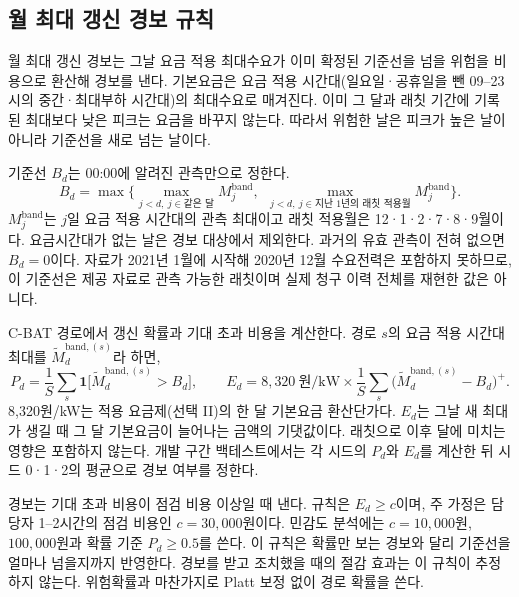 \subsection{월 최대 갱신 경보 규칙}
\label{sec:ch2-alarm}

월 최대 갱신 경보는 그날 요금 적용 최대수요가 이미 확정된 기준선을 넘을 위험을 비용으로 환산해 경보를 낸다. 기본요금은 요금 적용 시간대(일요일·공휴일을 뺀 09--23시의 중간·최대부하 시간대)의 최대수요로 매겨진다. 이미 그 달과 래칫 기간에 기록된 최대보다 낮은 피크는 요금을 바꾸지 않는다. 따라서 위험한 날은 피크가 높은 날이 아니라 기준선을 새로 넘는 날이다.

기준선 $B_d$는 00:00에 알려진 관측만으로 정한다.
\begin{equation}
B_d = \max\Big\{\max_{j<d,\ j\in\text{같은 달}} M^{\mathrm{band}}_j,\ \ \max_{j<d,\ j\in\text{지난 1년의 래칫 적용월}} M^{\mathrm{band}}_j\Big\}.
\label{eq:ch2-baseline}
\end{equation}
$M^{\mathrm{band}}_j$는 $j$일 요금 적용 시간대의 관측 최대이고 래칫 적용월은 12·1·2·7·8·9월이다. 요금시간대가 없는 날은 경보 대상에서 제외한다. 과거의 유효 관측이 전혀 없으면 $B_d=0$이다. 자료가 2021년 1월에 시작해 2020년 12월 수요전력은 포함하지 못하므로, 이 기준선은 제공 자료로 관측 가능한 래칫이며 실제 청구 이력 전체를 재현한 값은 아니다.

C-BAT 경로에서 갱신 확률과 기대 초과 비용을 계산한다. 경로 $s$의 요금 적용 시간대 최대를 $\tilde M^{\mathrm{band},(s)}_d$라 하면,
\begin{equation}
P_d=\frac1S\sum_{s}\mathbf 1\big[\tilde M^{\mathrm{band},(s)}_d > B_d\big],
\qquad
E_d = 8{,}320\ \text{원/kW}\times\frac1S\sum_{s}\big(\tilde M^{\mathrm{band},(s)}_d - B_d\big)^{+}.
\label{eq:ch2-cost}
\end{equation}
8,320원/kW는 적용 요금제(선택 II)의 한 달 기본요금 환산단가다. $E_d$는 그날 새 최대가 생길 때 그 달 기본요금이 늘어나는 금액의 기댓값이다. 래칫으로 이후 달에 미치는 영향은 포함하지 않는다. 개발 구간 백테스트에서는 각 시드의 $P_d$와 $E_d$를 계산한 뒤 시드 0·1·2의 평균으로 경보 여부를 정한다.

경보는 기대 초과 비용이 점검 비용 이상일 때 낸다. 규칙은 $E_d\ge c$이며, 주 가정은 담당자 1--2시간의 점검 비용인 $c=30{,}000$원이다. 민감도 분석에는 $c=10{,}000$원, $100{,}000$원과 확률 기준 $P_d\ge0.5$를 쓴다. 이 규칙은 확률만 보는 경보와 달리 기준선을 얼마나 넘을지까지 반영한다. 경보를 받고 조치했을 때의 절감 효과는 이 규칙이 추정하지 않는다. 위험확률과 마찬가지로 Platt 보정 없이 경로 확률을 쓴다.
